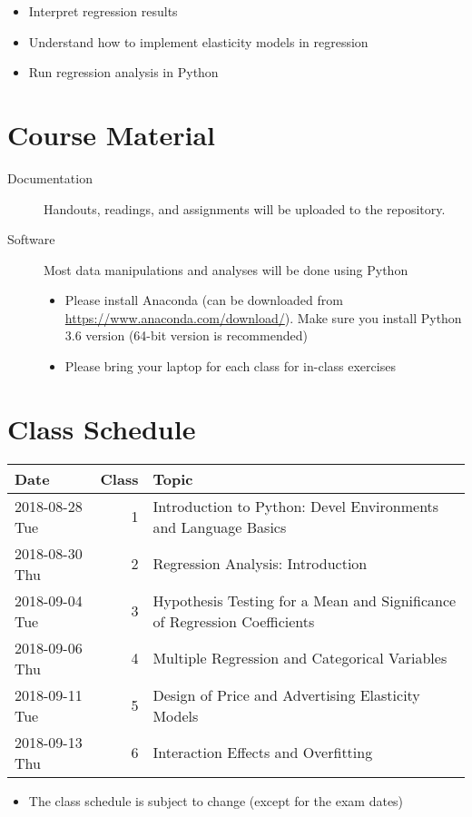 \documentclass[article,letterpaper,times,10pt,listings-bw,microtype]{scrartcl}
\begin{document}
\begin{itemize}
\item Interpret regression results
\item Understand how to implement elasticity models in regression
\item Run regression analysis in Python
\end{itemize}
\section*{Course Material}
\label{sec:org995f75f}
\begin{description}
\item[{Documentation}] Handouts, readings, and assignments will be uploaded to
the repository.
\item[{Software}] Most data manipulations and analyses will be done using Python

\begin{mdframed}[style=exampledefault, frametitle={Note}]
\begin{itemize}
\item Please install Anaconda (can be downloaded from
\url{https://www.anaconda.com/download/}). Make sure you install Python 3.6
version (64-bit version is recommended)
\item Please bring your laptop for each class for in-class exercises
\end{itemize}
\end{mdframed}
\end{description}
\clearpage
\section*{Class Schedule}
\label{sec:orgdf2b3c4}
\begin{center}
\begin{tabular}{lrl}
Date & Class & Topic\\
\hline
2018-08-28 Tue & 1 & Introduction to Python: Devel Environments and Language Basics\\
2018-08-30 Thu & 2 & Regression Analysis: Introduction\\
2018-09-04 Tue & 3 & Hypothesis Testing for a Mean and Significance of Regression Coefficients\\
2018-09-06 Thu & 4 & Multiple Regression and Categorical Variables\\
2018-09-11 Tue & 5 & Design of Price and Advertising Elasticity Models\\
2018-09-13 Thu & 6 & Interaction Effects and Overfitting\\
\end{tabular}
\end{center}

\begin{mdframed}[style=exampledefault, frametitle={Disclaimer}]
\begin{itemize}
\item The class schedule is subject to change (except for the exam dates)
\end{itemize}
\end{mdframed}
\end{document}
